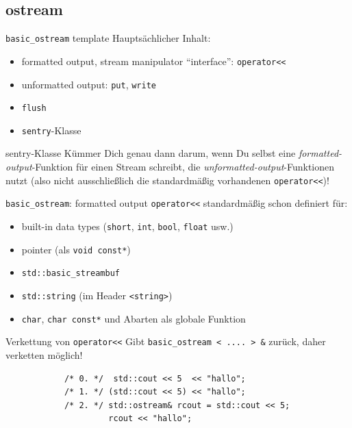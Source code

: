 \subsection{ostream}

\begin{frame}{\texttt{basic\_ostream} template}
	Hauptsächlicher Inhalt:
	\begin{itemize}
		\item formatted output, stream manipulator \enquote{interface}: \texttt{operator<<}
		\item unformatted output: \texttt{put}, \texttt{write}
		\item \texttt{flush}
		\item \texttt{sentry}-Klasse
	\end{itemize}
	
	\pause
	\vspace{2em}
	
	\begin{block}{sentry-Klasse}
		Kümmer Dich genau dann darum, wenn Du selbst eine \emph{formatted-output}-Funktion für einen Stream schreibt, die \emph{unformatted-output}-Funktionen nutzt (also nicht ausschließlich die standardmäßig vorhandenen \texttt{operator<<})!
	\end{block}
\end{frame}

\begin{frame}[fragile]{\texttt{basic\_ostream}: formatted output}
	\texttt{operator<<} standardmäßig schon definiert für:
	\begin{itemize}
		\item built-in data types (\texttt{short}, \texttt{int}, \texttt{bool}, \texttt{float} usw.)
		\item pointer (als \texttt{void const*})
		\item \texttt{std::basic\_streambuf}
		\item \texttt{std::string} (im Header \texttt{<string>})
		\item \texttt{char}, \texttt{char const*} und Abarten als globale Funktion
	\end{itemize}
	
	\pause
	\vspace{0.5em}
	
	\begin{block}{Verkettung von \texttt{operator<<}}
		Gibt \texttt{basic\_ostream < .... > \&} zurück, daher verketten möglich!
		\begin{lstlisting}
			/* 0. */  std::cout << 5  << "hallo";
			/* 1. */ (std::cout << 5) << "hallo";
			/* 2. */ std::ostream& rcout = std::cout << 5;
			         rcout << "hallo";
		\end{lstlisting}
	\end{block}
\end{frame}

